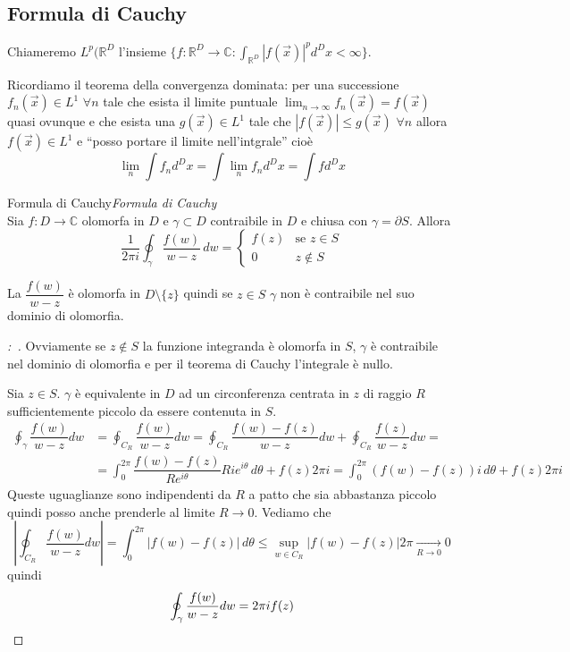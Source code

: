 \documentclass[11pt,a4paper,twoside]{book}
\newenvironment{teorema}[1][\empty]{\begin{Teorema}{
\ifx\empty#1\relax\else\mdseries\itshape#1\\\fi
}{}}{\end{Teorema}}
\newenvironment{dimo}[1][\proofname]{
	\begin{tcolorbox}[
	breakable, 
	enhanced, 
	interior hidden, 
	frame hidden, 
	borderline west = {1pt}{0pt}{gray}, 
	top=0pt, bottom=0pt, left=0pt]
\begin{proof}[#1:~]
}
{
\end{proof}
\end{tcolorbox}
}
\theoremstyle{esss}
\theoremstyle{dotless}
\numberwithin{equation}{section} %
\begin{document}
\subsection{Formula di Cauchy}

Chiameremo $L^p(\mathbb{R}^D$ l'insieme $\{f:\mathbb{R}^D\rightarrow\mathbb{C}:\int_{\mathbb{R}^D} |f(\vec{x})|^p d^D x<\infty\}$.

Ricordiamo il teorema della convergenza dominata: per una successione $f_n(\vec{x})\in L^1$ $\forall n$ tale che esista il limite puntuale $\lim_{n\rightarrow\infty}f_n(\vec{x})=f(\vec{x})$ quasi ovunque e che esista una $g(\vec{x})\in L^1$ tale che $|f(\vec{x})|\leq g(\vec{x})$ $\forall n$ allora $f(\vec{x})\in L^1$ e ``posso portare il limite nell'intgrale'' cioè \[ \lim_{n}\int f_{n}d^D x=\int \lim_n f_n d^Dx = \int f d^D x\]  



\begin{teorema}[Formula di Cauchy]
Sia $f:D\rightarrow\mathbb{C}$ olomorfa in $D$ e $\gamma\subset D$ contraibile in $D$ e chiusa con $\gamma=\partial S$. Allora
\begin{equation}
\dfrac{1}{2\pi i}\oint_\gamma \dfrac{f(w)}{w-z}\, dw = \begin{cases} f(z) & \text{se } z\in S \\ 0 & z\not\in S \end{cases}
\end{equation}
\end{teorema}
La $\dfrac{f(w)}{w-z}$ è olomorfa in $D\setminus\{z\}$ quindi se $z\in S$ $\gamma$ non è contraibile nel suo dominio di olomorfia.
\begin{dimo}
Ovviamente se $z\not\in S$ la funzione integranda è olomorfa in $S$, $\gamma$ è contraibile nel dominio di olomorfia e per il teorema di Cauchy l'integrale è nullo.


Sia $z\in S$. $\gamma$ è equivalente in $D$ ad un circonferenza centrata in $z$ di raggio $R$ sufficientemente piccolo da essere contenuta in $S$.
\begin{align*}
\oint_\gamma \dfrac{f(w)}{w-z} dw&=\oint_{C_R} \dfrac{f(w)}{w-z} dw=\oint_{C_R} \dfrac{f(w)-f(z)}{w-z} dw+\oint_{C_R} \dfrac{f(z)}{w-z} dw=\\
&= \int_{0}^{2\pi} \dfrac{f(w)-f(z)}{Re^{i\theta}} Rie^{i\theta}\,d\theta+f(z)2\pi i=\int_{0}^{2\pi} \left(f(w)-f(z)\right) i\,d\theta + f(z)2\pi i
\end{align*}
Queste uguaglianze sono indipendenti da $R$ a patto che sia abbastanza piccolo quindi posso anche prenderle al limite $R\rightarrow0$. Vediamo che
\[
\left| \oint_{C_R} \dfrac{f(w)}{w-z} dw \right| = \int_{0}^{2\pi} \left|f(w)-f(z)\right| \,d\theta \leq  \sup_{w\in C_R}\left| f(w)-f(z) \right| 2\pi \underset{R\rightarrow 0}{\longrightarrow} 0
\]
quindi 
\[
\oint_\gamma \dfrac{f(w)}{w-z} dw = 2\pi i f(z) \qedhere
\]
\end{dimo}
\end{document}
